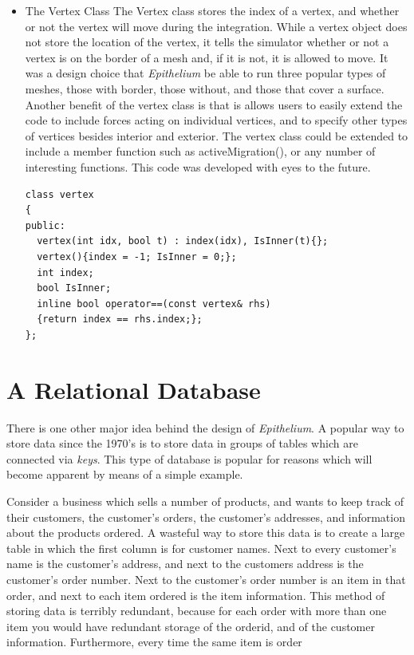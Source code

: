 \begin{itemize}
\begin{lstlisting}
\end{lstlisting}

\item{The Vertex Class}
The {\color{green} Vertex} class stores the index of a vertex, and 
whether or not the vertex will move during the integration. While a 
vertex object does not store the location of the vertex, it tells the 
simulator whether or not a vertex is on the border of a mesh and, if it 
is not, it is allowed to move. It was a design choice that 
\emph{Epithelium} be able to run three popular types of meshes, those 
with border, those without, and those that cover a surface.  Another 
benefit of the vertex class is that is allows users to easily extend 
the code to include forces acting on individual vertices, and to 
specify other types of vertices besides interior and exterior. The 
vertex class could be extended to include a member function such as 
activeMigration(), or any number of interesting functions. This code was developed with eyes to the future. 
\begin{lstlisting}
class vertex
{
public:
  vertex(int idx, bool t) : index(idx), IsInner(t){};
  vertex(){index = -1; IsInner = 0;};
  int index;
  bool IsInner;
  inline bool operator==(const vertex& rhs)
  {return index == rhs.index;};
};
\end{lstlisting}
\end{itemize}


\section{A Relational Database}
There is one other major idea behind the design of \emph{Epithelium}. A 
popular way to store data since the 1970's is to store data in groups of tables which are connected via \emph{keys}. This type of database is popular for reasons which will become apparent by means of a simple example. 

Consider a business which sells a number of products, and wants to keep 
track of their customers, the customer's orders, the customer's 
addresses, and information about the products ordered. A wasteful way 
to store this data is to create a large table in which the first column 
is for customer names. Next to every customer's name is the customer's 
address, and next to the customers address is the customer's order 
number. Next to the customer's order number is an item in that order, 
and next to each item ordered is the item information. This method of 
storing data is terribly redundant, because for each order with more 
than one item you would have redundant storage of the orderid, and of 
the customer information. Furthermore, every time the same item is 
order 

